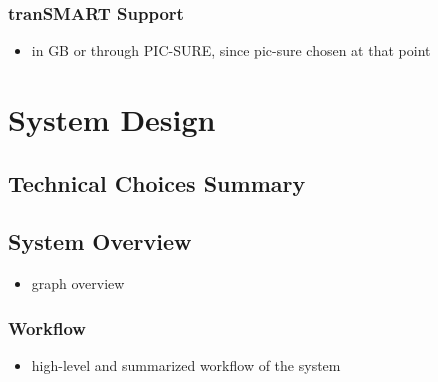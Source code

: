 


\subsubsection{tranSMART Support}
\begin{itemize}
    \item in GB or through PIC-SURE, since pic-sure chosen at that point
\end{itemize}



\section{System Design}

\subsection{Technical Choices Summary}

\subsection{System Overview}
\begin{itemize}
    \item graph overview
\end{itemize}
\subsubsection{Workflow}
\begin{itemize}
    \item high-level and summarized workflow of the system
\end{itemize}




